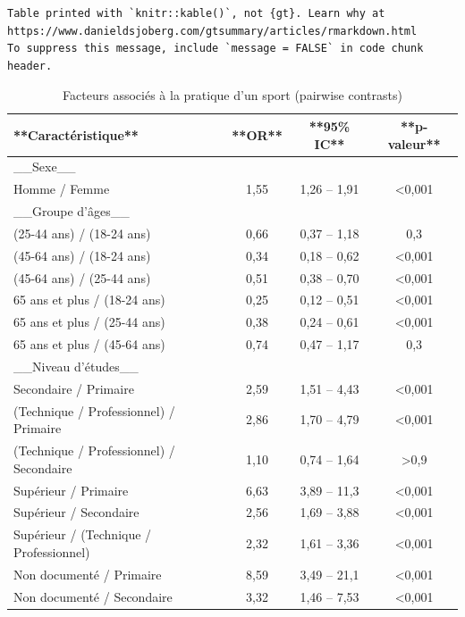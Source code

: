 \documentclass[
  letterpaper,
  DIV=11,
  numbers=noendperiod,
  oneside]{scrreprt}
\begin{document}
\begin{verbatim}
Table printed with `knitr::kable()`, not {gt}. Learn why at
https://www.danieldsjoberg.com/gtsummary/articles/rmarkdown.html
To suppress this message, include `message = FALSE` in code chunk header.
\end{verbatim}

\hypertarget{tbl-regression-logistique-pairwise}{}
\begin{table}
\caption{\label{tbl-regression-logistique-pairwise}Facteurs associés à la pratique d'un sport (pairwise contrasts) }\tabularnewline

\centering
\begin{tabular}{l|c|c|c}
\hline
**Caractéristique** & **OR** & **95\% IC** & **p-valeur**\\
\hline
\_\_Sexe\_\_ &  &  & \\
\hline
Homme / Femme & 1,55 & 1,26 – 1,91 & <0,001\\
\hline
\_\_Groupe d'âges\_\_ &  &  & \\
\hline
(25-44 ans) / (18-24 ans) & 0,66 & 0,37 – 1,18 & 0,3\\
\hline
(45-64 ans) / (18-24 ans) & 0,34 & 0,18 – 0,62 & <0,001\\
\hline
(45-64 ans) / (25-44 ans) & 0,51 & 0,38 – 0,70 & <0,001\\
\hline
65 ans et plus / (18-24 ans) & 0,25 & 0,12 – 0,51 & <0,001\\
\hline
65 ans et plus / (25-44 ans) & 0,38 & 0,24 – 0,61 & <0,001\\
\hline
65 ans et plus / (45-64 ans) & 0,74 & 0,47 – 1,17 & 0,3\\
\hline
\_\_Niveau d'études\_\_ &  &  & \\
\hline
Secondaire / Primaire & 2,59 & 1,51 – 4,43 & <0,001\\
\hline
(Technique / Professionnel) / Primaire & 2,86 & 1,70 – 4,79 & <0,001\\
\hline
(Technique / Professionnel) / Secondaire & 1,10 & 0,74 – 1,64 & >0,9\\
\hline
Supérieur / Primaire & 6,63 & 3,89 – 11,3 & <0,001\\
\hline
Supérieur / Secondaire & 2,56 & 1,69 – 3,88 & <0,001\\
\hline
Supérieur / (Technique / Professionnel) & 2,32 & 1,61 – 3,36 & <0,001\\
\hline
Non documenté / Primaire & 8,59 & 3,49 – 21,1 & <0,001\\
\hline
Non documenté / Secondaire & 3,32 & 1,46 – 7,53 & <0,001\\

\end{tabular}
\end{table}
\end{document}
